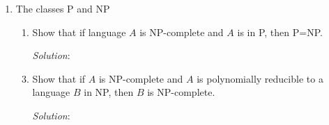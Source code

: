 \documentclass[]{article}
\begin{document}
\begin{enumerate}
\item The classes P and NP
\begin{enumerate}
\item Show that if language $A$ is NP-complete and $A$ is in P, then P=NP.
\item[\emph{Solution}:]

\item Show that if $A$ is NP-complete and $A$ is polynomially reducible to a
language $B$ in NP, then $B$ is NP-complete.
\item[\emph{Solution}:]

\end{enumerate}
\end{enumerate}
\end{document}

